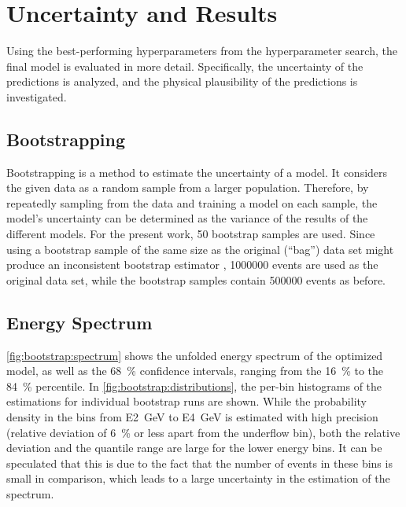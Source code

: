 \section{Uncertainty and Results}
Using the best-performing hyperparameters from the hyperparameter search, %
the final model is evaluated in more detail.
Specifically,
  the uncertainty of the predictions is analyzed, %
  and the physical plausibility of the predictions is investigated.


\subsection{Bootstrapping}
Bootstrapping \cite{bootstrap} is a method to estimate the uncertainty of a model.
It considers the given data as a random sample from a larger population.
Therefore,
by repeatedly sampling from the data and training a model on each sample,
the model's uncertainty can be determined
as the variance of the results of the different models.
%
For the present work, \num{50} bootstrap samples are used.
Since using a bootstrap sample of the same size as the original (\enquote{bag}) data set
might produce an inconsistent bootstrap estimator \cite{bootstrap_samplesize},
\num{1000000} events are used as the original data set,
while the bootstrap samples contain \num{500000} events as before.


\subsection{Energy Spectrum}
\autoref{fig:bootstrap:spectrum} shows the unfolded energy spectrum of the optimized model,
as well as the \SI{68}{\percent} confidence intervals,
  ranging from the \SI{16}{\percent} to the \SI{84}{\percent} percentile.
In \autoref{fig:bootstrap:distributions},
the per-bin histograms of the estimations for individual bootstrap runs are shown.
While the probability density in the bins from \SI{E2}{\giga\electronvolt} to \SI{E4}{\giga\electronvolt} is estimated with high precision
  (relative deviation of \SI{6}{\percent} or less apart from the underflow bin),
both the relative deviation and the quantile range are large for the lower energy bins.
It can be speculated that this is due to the fact that the number of events in these bins is small in comparison,
which leads to a large uncertainty in the estimation of the spectrum.

